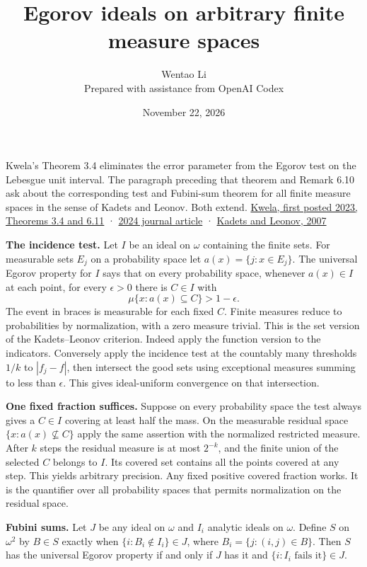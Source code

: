 \documentclass[11pt]{article}
\author{Wentao Li\\\small Prepared with assistance from OpenAI Codex}
\date{November 22, 2026}
\title{Egorov ideals on arbitrary finite measure spaces}
\begin{document}
\maketitle
Kwela's Theorem 3.4 eliminates the error parameter from the Egorov test on the Lebesgue unit interval. The paragraph preceding that theorem and Remark 6.10 ask about the corresponding test and Fubini-sum theorem for all finite measure spaces in the sense of Kadets and Leonov. Both extend. \href{https://arxiv.org/abs/2312.00205}{Kwela, first posted 2023, Theorems 3.4 and 6.11} · \href{https://doi.org/10.1016/j.topol.2024.109112}{2024 journal article} · \href{https://jmag.ilt.kharkiv.ua/index.php/jmag/article/view/jm03-0196e}{Kadets and Leonov, 2007}

\textbf{The incidence test.} Let \(I\) be an ideal on \(\omega\) containing the finite sets. For measurable sets \(E_j\) on a probability space let \(a(x)=\{j:x\in E_j\}\). The universal Egorov property for \(I\) says that on every probability space, whenever \(a(x)\in I\) at each point, for every \(\epsilon>0\) there is \(C\in I\) with \[\mu\{x:a(x)\subseteq C\}>1-\epsilon.\] The event in braces is measurable for each fixed \(C\). Finite measures reduce to probabilities by normalization, with a zero measure trivial. This is the set version of the Kadets--Leonov criterion. Indeed apply the function version to the indicators. Conversely apply the incidence test at the countably many thresholds \(1/k\) to \(|f_j-f|\), then intersect the good sets using exceptional measures summing to less than \(\epsilon\). This gives ideal-uniform convergence on that intersection.

\textbf{One fixed fraction suffices.} Suppose on every probability space the test always gives a \(C\in I\) covering at least half the mass. On the measurable residual space \(\{x:a(x)\not\subseteq C\}\) apply the same assertion with the normalized restricted measure. After \(k\) steps the residual measure is at most \(2^{-k}\), and the finite union of the selected \(C\) belongs to \(I\). Its covered set contains all the points covered at any step. This yields arbitrary precision. Any fixed positive covered fraction works. It is the quantifier over all probability spaces that permits normalization on the residual space.

\textbf{Fubini sums.} Let \(J\) be any ideal on \(\omega\) and \(I_i\) analytic ideals on \(\omega\). Define \(S\) on \(\omega^2\) by \(B\in S\) exactly when \(\{i:B_i\notin I_i\}\in J\), where \(B_i=\{j:(i,j)\in B\}\). Then \(S\) has the universal Egorov property if and only if \(J\) has it and \(\{i:I_i\text{ fails it}\}\in J\).
\end{document}
